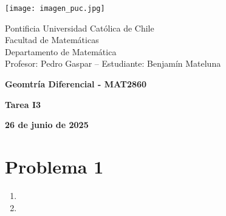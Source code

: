 \documentclass{article}
\begin{document}
\begin{minipage}{2.5cm}
    \texttt{[image: imagen\_puc.jpg]}
\end{minipage}
\begin{minipage}{14cm}
    {\sc Pontificia Universidad Católica de Chile\\
    Facultad de Matemáticas\\
    Departamento de Matemática\\
    Profesor: Pedro Gaspar -- Estudiante: Benjamín Mateluna}
\end{minipage}
\vspace{1ex}

{\centerline{\bf Geomtría Diferencial - MAT2860}
\centerline{\bf Tarea I3}}
\centerline{\bf 26 de junio de 2025}

\section*{Problema 1}
\begin{enumerate}
    \item 
    \item 
\end{enumerate}
\end{document}
